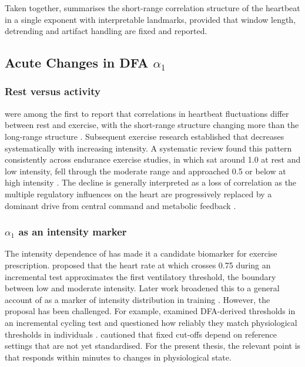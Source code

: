 Taken together, \al{} summarises the short-range correlation structure of the heartbeat in a single exponent with interpretable landmarks, provided that window length, detrending and artifact handling are fixed and reported.

\subsection{Acute Changes in DFA $\alpha_1$}
\label{sec:bg-acute}

\subsubsection{Rest versus activity}

\citet{karasik2002} were among the first to report that correlations in heartbeat fluctuations differ between rest and exercise, with the short-range structure changing more than the long-range structure . Subsequent exercise research established that \al{} decreases systematically with increasing intensity. A systematic review found this pattern consistently across endurance exercise studies, in which \al{} sat around 1.0 at rest and low intensity, fell through the moderate range and approached 0.5 or below at high intensity \citep{gronwald2020review}. The decline is generally interpreted as a loss of correlation as the multiple regulatory influences on the heart are progressively replaced by a dominant drive from central command and metabolic feedback \citep{gronwald2020biomarker,balague2020}.

\subsubsection{\texorpdfstring{$\alpha_1$}{alpha1} as an intensity marker}

The intensity dependence of \al{} has made it a candidate biomarker for exercise prescription. \citet{rogers2021threshold} proposed that the heart rate at which \al{} crosses 0.75 during an incremental test approximates the first ventilatory threshold, the boundary between low and moderate intensity. Later work broadened this to a general account of \al{} as a marker of intensity distribution in training \citep{gronwald2020biomarker,rogers2022update}. However, the proposal has been challenged. For example, \citet{cassirame2025} examined DFA-derived thresholds in an incremental cycling test and questioned how reliably they match physiological thresholds in individuals . \citet{hoos2025} cautioned that fixed cut-offs depend on reference settings that are not yet standardised. For the present thesis, the relevant point is that \al{} responds within minutes to changes in physiological state.

